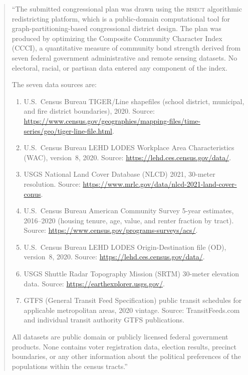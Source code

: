 \begin{quote}
``The submitted congressional plan was drawn using the \textsc{bisect}
algorithmic redistricting platform, which is a public-domain computational
tool for graph-partitioning-based congressional district design.
The plan was produced by optimizing the Composite Community Character Index
(CCCI), a quantitative measure of community bond strength derived from
seven federal government administrative and remote sensing datasets.
No electoral, racial, or partisan data entered any component of the index.

The seven data sources are:
\begin{enumerate}
  \item U.S.\ Census Bureau TIGER/Line shapefiles (school district, municipal,
    and fire district boundaries), 2020.
    Source: \url{https://www.census.gov/geographies/mapping-files/time-series/geo/tiger-line-file.html}.
  \item U.S.\ Census Bureau LEHD LODES Workplace Area Characteristics
    (WAC), version~8, 2020.
    Source: \url{https://lehd.ces.census.gov/data/}.
  \item USGS National Land Cover Database (NLCD) 2021, 30-meter resolution.
    Source: \url{https://www.mrlc.gov/data/nlcd-2021-land-cover-conus}.
  \item U.S.\ Census Bureau American Community Survey 5-year estimates,
    2016--2020 (housing tenure, age, value, and renter fraction by tract).
    Source: \url{https://www.census.gov/programs-surveys/acs/}.
  \item U.S.\ Census Bureau LEHD LODES Origin-Destination file (OD),
    version~8, 2020.
    Source: \url{https://lehd.ces.census.gov/data/}.
  \item USGS Shuttle Radar Topography Mission (SRTM) 30-meter elevation data.
    Source: \url{https://earthexplorer.usgs.gov/}.
  \item GTFS (General Transit Feed Specification) public transit schedules
    for applicable metropolitan areas, 2020 vintage.
    Source: TransitFeeds.com and individual transit authority GTFS publications.
\end{enumerate}

All datasets are public domain or publicly licensed federal government products.
None contains voter registration data, election results, precinct boundaries,
or any other information about the political preferences of the populations
within the census tracts.''
\end{quote}

